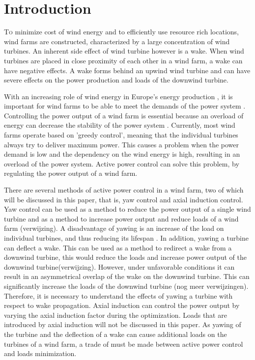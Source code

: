 \section{Introduction}
	
\lettrine[nindent=0em,lines=3]To minimize cost of wind energy and to efficiently use resource rich locations, wind farms are constructed, characterized by a large concentration of wind turbines. An inherent side effect of wind turbine however is a wake. When wind turbines are placed in close proximity of each other in a wind farm, a wake can have negative effects. A wake forms behind an upwind wind turbine and can have severe effects on the power production and loads of the downwind turbine. 

With an increasing role of wind energy in Europe's energy production \cite{Nat2016}, it is important for wind farms to be able to meet the demands of the power system \cite{Tande2003}. Controlling the power output of a wind farm is essential because an overload of energy can decrease the stability of the power system \cite{Tande2003}. Currently, most wind farms operate based on 'greedy control', meaning that the individual turbines always try to deliver maximum power. This causes a problem when the power demand is low and the dependency on the wind energy is high, resulting in an overload of the power system. Active power control can solve this problem, by regulating the power output of a wind farm.

There are several methods of active power control in a wind farm, two of which will be discussed in this paper, that is, yaw control and axial induction control. Yaw control can be used as a method to reduce the power output of a single wind turbine and as a method to increase power output and reduce loads of a wind farm (verwijzing). A disadvantage of yawing is an increase of the load on individual turbines, and thus reducing its lifespan \cite{Zalkind2016,Kanev2017}. In addition, yawing a turbine can deflect a wake. This can be used as a method to redirect a wake from a downwind turbine, this would reduce the loads and increase power output of the downwind turbine(verwijzing). However, under unfavorable conditions it can result in an asymmetrical overlap of the wake on the downwind turbine. This can significantly increase the loads of the downwind turbine \cite{Wilson2017,Dijk2016}(nog meer verwijzingen). Therefore, it is necessary to understand the effects of yawing a turbine with respect to wake propagation. Axial induction can control the power output by varying the axial induction factor during the optimization. Loads that are introduced by axial induction will not be discussed in this paper.  As yawing of the turbine and the deflection of a wake can cause additional loads on the turbines of a wind farm, a trade of must be made between active power control and loads minimization.

